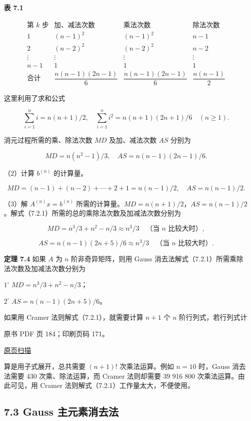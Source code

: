 \textbf{表 7.1}

\[
\begin{array}{c|c|c|c}
\text{第 }k\text{ 步}&\text{加、减法次数}&\text{乘法次数}&\text{除法次数}\\\hline
1&(n-1)^2&(n-1)^2&n-1\\
2&(n-2)^2&(n-2)^2&n-2\\
\vdots&\vdots&\vdots&\vdots\\
n-1&1&1&1\\\hline
\text{合计}&\dfrac{n(n-1)(2n-1)}{6}&\dfrac{n(n-1)(2n-1)}{6}&\dfrac{n(n-1)}{2}
\end{array}
\]

这里利用了求和公式

\[\sum_{i=1}^{n}i=n(n+1)/2,\quad \sum_{i=1}^{n}i^2=n(n+1)(2n+1)/6\quad(n\ge1).\]

消元过程所需的乘、除法次数 \(MD\) 及加、减法次数 \(AS\) 分别为

\[MD=n(n^2-1)/3,\quad AS=n(n-1)(2n-1)/6.\]

（2）计算 \(b^{(n)}\) 的计算量。

\[MD=(n-1)+(n-2)+\cdots+2+1=n(n-1)/2,\quad AS=n(n-1)/2.\]

（3）解 \(A^{(n)}x=b^{(n)}\) 所需的计算量。\(MD=n(n+1)/2\)，\(AS=n(n-1)/2\)。解式（7.2.1）所需的总的乘除法次数及加减法次数分别为

\[MD=n^3/3+n^2-n/3\approx n^3/3\quad\text{（当 $n$ 比较大时）},\]

\[AS=n(n-1)(2n+5)/6\approx n^3/3\quad\text{（当 $n$ 比较大时）}.\]

\textbf{定理 7.4} 如果 \(A\) 为 \(n\) 阶非奇异矩阵，则用 Gauss 消去法解式（7.2.1）所需乘除法次数及加减法次数分别为

\(1^\circ\;MD=n^3/3+n^2-n/3\)；

\(2^\circ\;AS=n(n-1)(2n+5)/6\)。

如果用 Cramer 法则解式（7.2.1），就需要计算 \(n+1\) 个 \(n\) 阶行列式，若行列式计

\clearpage

原书 PDF 页 184；印刷页码 171。

\href{source-images/pdf-184.jpeg}{原页扫描}

算是用子式展开，总共需要 \((n+1)!\) 次乘法运算。例如 \(n=10\) 时，Gauss 消去法需要 430 次乘、除法运算，而 Cramer 法则却需要 39 916 800 次乘法运算。由此可见，用 Cramer 法则解式（7.2.1）工作量太大，不便使用。

\subsection{7.3 Gauss 主元素消去法}\label{ch07a-gauss-ux4e3bux5143ux7d20ux6d88ux53bbux6cd5}


